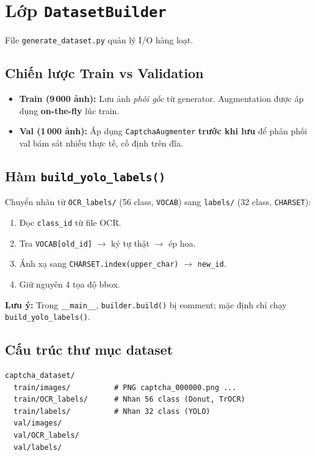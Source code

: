 \documentclass[a4paper,12pt]{report}
\begin{document}
\section{Lớp \texttt{DatasetBuilder}}
File \texttt{generate\_dataset.py} quản lý I/O hàng loạt.

\subsection{Chiến lược Train vs Validation}
\begin{itemize}[leftmargin=*]
  \item \textbf{Train (9\,000 ảnh):} Lưu ảnh \textit{phôi gốc} từ generator. Augmentation được áp dụng \textbf{on-the-fly} lúc train.
  \item \textbf{Val (1\,000 ảnh):} Áp dụng \texttt{CaptchaAugmenter} \textbf{trước khi lưu} để phân phối val bám sát nhiễu thực tế, cố định trên đĩa.
\end{itemize}

\subsection{Hàm \texttt{build\_yolo\_labels()}}
Chuyển nhãn từ \texttt{OCR\_labels/} (56 class, \texttt{VOCAB}) sang \texttt{labels/} (32 class, \texttt{CHARSET}):
\begin{enumerate}[leftmargin=*]
  \item Đọc \texttt{class\_id} từ file OCR.
  \item Tra \texttt{VOCAB[old\_id]} $\rightarrow$ ký tự thật $\rightarrow$ ép hoa.
  \item Ánh xạ sang \texttt{CHARSET.index(upper\_char)} $\rightarrow$ \texttt{new\_id}.
  \item Giữ nguyên 4 tọa độ bbox.
\end{enumerate}

\textbf{Lưu ý:} Trong \texttt{\_\_main\_\_}, \texttt{builder.build()} bị comment; mặc định chỉ chạy \texttt{build\_yolo\_labels()}.

\subsection{Cấu trúc thư mục dataset}
\begin{verbatim}
captcha_dataset/
  train/images/          # PNG captcha_000000.png ...
  train/OCR_labels/      # Nhan 56 class (Donut, TrOCR)
  train/labels/          # Nhan 32 class (YOLO)
  val/images/
  val/OCR_labels/
  val/labels/
\end{verbatim}
\end{document}
